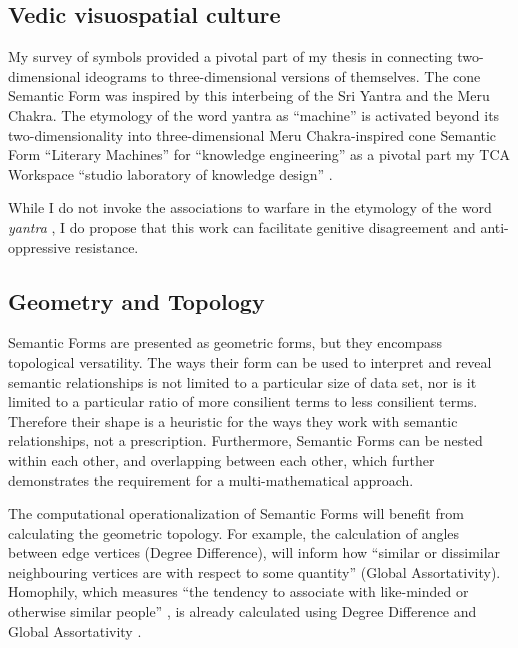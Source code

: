 \subsection{Vedic visuospatial culture}
My survey of symbols provided a pivotal part of my thesis in connecting two-dimensional ideograms to three-dimensional versions of themselves. The cone Semantic Form was inspired by this interbeing of the Sri Yantra and the Meru Chakra. The etymology of the word yantra as “machine” \citep[p. 28]{buhnemann_mandalas_2003} is activated beyond its two-dimensionality into three-dimensional Meru Chakra-inspired \citep[p. 31]{buhnemann_mandalas_2003} cone Semantic Form “Literary Machines” \citep{nelson_literary_1981} for “knowledge engineering” \citep[p. 8]{wielinga_kads_1992} as a pivotal part my TCA Workspace “studio laboratory of knowledge design” \citep[p. 197]{drucker_graphesis_2014}.

While I do not invoke the associations to warfare in the etymology of the word \textit{yantra} \citep[p. 28]{buhnemann_mandalas_2003}, I do propose that this work can facilitate genitive disagreement and anti-oppressive resistance.  

\subsection{Geometry and Topology}

Semantic Forms are presented as geometric forms, but they encompass topological versatility. The ways their form can be used to interpret and reveal semantic relationships is not limited to a particular size of data set, nor is it limited to a particular ratio of more consilient terms to less consilient terms. Therefore their shape is a heuristic for the ways they work with semantic relationships, not a prescription. Furthermore, Semantic Forms can be nested within each other, and overlapping between each other, which further demonstrates the requirement for a multi-mathematical approach.

The computational operationalization of Semantic Forms will benefit from calculating the geometric topology. For example, the calculation of angles between edge vertices (Degree Difference), will inform how “similar or dissimilar neighbouring vertices are with respect to some quantity” \citep[p.2]{farzam_degree_2020} (Global Assortativity). Homophily, which measures “the tendency to associate with like-minded or otherwise similar people” \citep[p.2]{farzam_degree_2020}, is already calculated using Degree Difference and Global Assortativity \citep[p.2]{farzam_degree_2020}.
  

